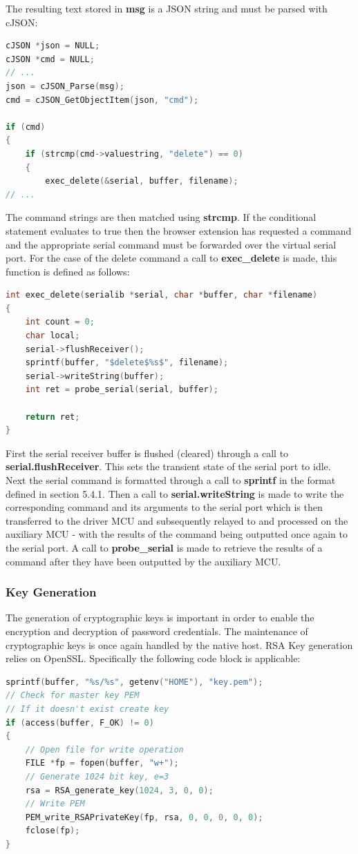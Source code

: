 The resulting text stored in \textbf{msg} is a JSON string and must be parsed with cJSON:
\begin{lstlisting}[language=C]
cJSON *json = NULL;
cJSON *cmd = NULL;
// ...
json = cJSON_Parse(msg);
cmd = cJSON_GetObjectItem(json, "cmd");
    
if (cmd)
{
    if (strcmp(cmd->valuestring, "delete") == 0)
    {
        exec_delete(&serial, buffer, filename);
// ...
\end{lstlisting}
The command strings are then matched using \textbf{strcmp}. If the conditional statement evaluates to true then the browser extension has requested a command and the appropriate serial command must be forwarded over the virtual serial port. For the case of the delete command a call to \textbf{exec\_delete} is made, this function is defined as follows:
\begin{lstlisting}[language=C]
int exec_delete(serialib *serial, char *buffer, char *filename)
{
    int count = 0;
    char local;
    serial->flushReceiver();
    sprintf(buffer, "$delete$%s$", filename);
    serial->writeString(buffer);
    int ret = probe_serial(serial, buffer);

    return ret;
}

\end{lstlisting}

First the serial receiver buffer is flushed (cleared) through a call to \textbf{serial.flushReceiver}. This sets the transient state of the serial port to idle. Next the serial command is formatted through a call to \textbf{sprintf} in the format defined in section 5.4.1. Then a call to \textbf{serial.writeString} is made to write the corresponding command and its arguments to the serial port which is then transferred to the driver MCU and subsequently relayed to and processed on the auxiliary MCU - with the results of the command being outputted once again to the serial port. A call to \textbf{probe\_serial} is made to retrieve the results of a command after they have been outputted by the auxiliary MCU. 
\subsubsection{Key Generation}
The generation of cryptographic keys is important in order to enable the encryption and decryption of password credentials. The maintenance of cryptographic keys is once again handled by the native host. RSA Key generation relies on OpenSSL. Specifically the following code block is applicable:
\begin{lstlisting}[language=C]
sprintf(buffer, "%s/%s", getenv("HOME"), "key.pem");
// Check for master key PEM
// If it doesn't exist create key
if (access(buffer, F_OK) != 0)
{
    // Open file for write operation
    FILE *fp = fopen(buffer, "w+");
    // Generate 1024 bit key, e=3
    rsa = RSA_generate_key(1024, 3, 0, 0);
    // Write PEM
    PEM_write_RSAPrivateKey(fp, rsa, 0, 0, 0, 0, 0);
    fclose(fp);
}

\end{lstlisting}


